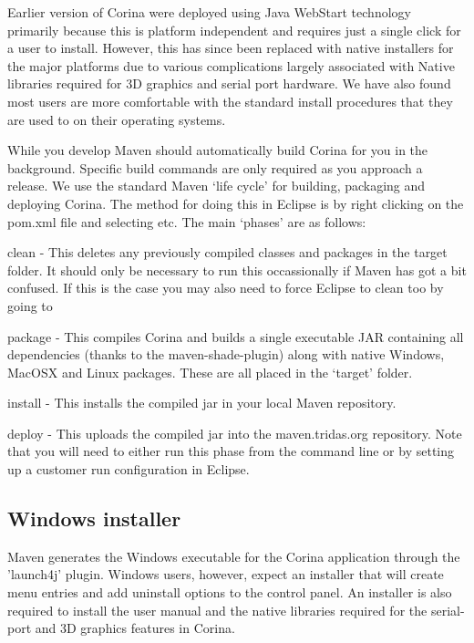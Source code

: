 Earlier version of Corina were deployed using Java WebStart technology primarily because this is platform independent and requires just a single click for a user to install.  However, this has since been replaced with native installers for the major platforms due to various complications largely associated with Native libraries required for 3D graphics and serial port hardware.  We have also found most users are more comfortable with the standard install procedures that they are used to on their operating systems.

While you develop Maven should automatically build Corina for you in the background.  Specific build commands are only required as you approach a release.  We use the standard Maven `life cycle' for building, packaging and deploying Corina.  The method for doing this in Eclipse is by right clicking on the pom.xml file and selecting  etc.  The main `phases' are as follows:

\begin{description*}
 \item[clean] - This deletes any previously compiled classes and packages in the target folder.  It should only be necessary to run this occassionally if Maven has got a bit confused.  If this is the case you may also need to force Eclipse to clean too by going to 
 \item[package] - This compiles Corina and builds a single executable JAR containing all dependencies (thanks to the maven-shade-plugin) along with native Windows, MacOSX and Linux packages.  These are all placed in the `target' folder.
 \item[install] - This installs the compiled jar in your local Maven repository.
 \item[deploy] - This uploads the compiled jar into the maven.tridas.org repository.  Note that you will need to either run this phase from the command line or by setting up a customer run configuration in Eclipse.
\end{description*}



\subsection{Windows installer}
\label{txt:windowsInstaller}
Maven generates the Windows executable for the Corina application through the 'launch4j' plugin.  Windows users, however, expect an installer that will create menu entries and add uninstall options to the control panel.  An installer is also required to install the user manual and the native libraries required for the serial-port and 3D graphics features in Corina.  


